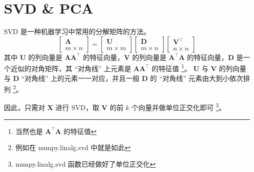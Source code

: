 	\section{SVD \& PCA}
		SVD 是一种机器学习中常用的分解矩阵的方法。
		\begin{equation}
			\begin{bmatrix}
				\bm{A} \\
				m \times n
			\end{bmatrix} 
			= 
			\begin{bmatrix}
				\bm{U} \\
				m \times m
			\end{bmatrix}
			\begin{bmatrix}
				\bm{D} \\
				m \times n
			\end{bmatrix}
			\begin{bmatrix}
				\bm{V}^\intercal \\
				n \times n
			\end{bmatrix}
		\end{equation}
		其中 $ \bm{U} $ 的列向量是 $ \bm{AA}^\intercal $ 的特征向量，$ \bm{V} $ 的列向量是 $ \bm{A}^\intercal \bm{A} $ 的特征向量，$ \bm{D} $ 是一个近似的对角矩阵，其 “对角线” 上元素是 $ \bm{AA}^\intercal $ 的特征值
		\footnote{当然也是 $ \bm{A}^\intercal \bm{A} $ 的特征值}。
		$ \bm{U} $ 与 $ \bm{V} $ 的列向量与 $ \bm{D} $ “对角线” 上的元素一一对应，并且一般 $ \bm{D} $ 的 “对角线” 元素由大到小依次排列
		\footnote{例如在 numpy.linalg.svd 中就是如此}。
		
		因此，只需对 $ \bm{X} $ 进行 SVD，取 $ \bm{V} $ 的前 $ k $ 个向量并做单位正交化即可
		\footnote{numpy.linalg.svd 函数已经做好了单位正交化}。